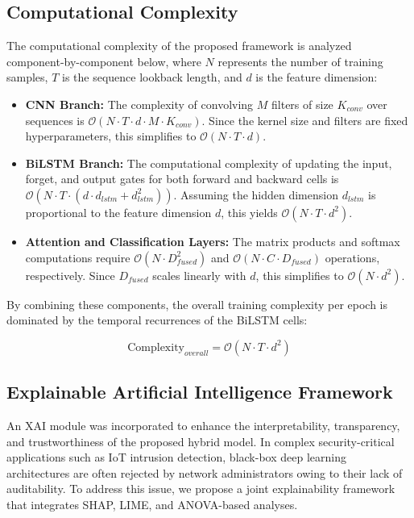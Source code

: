 \documentclass[a4paper,fleqn]{cas-sc}
\begin{document}
\subsection{Computational Complexity}

The computational complexity of the proposed framework is analyzed component-by-component below, where $N$ represents the number of training samples, $T$ is the sequence lookback length, and $d$ is the feature dimension:
\begin{itemize}
    \item \textbf{CNN Branch:} The complexity of convolving $M$ filters of size $K_{conv}$ over sequences is $\mathcal{O}(N \cdot T \cdot d \cdot M \cdot K_{conv})$. Since the kernel size and filters are fixed hyperparameters, this simplifies to $\mathcal{O}(N \cdot T \cdot d)$.
    \item \textbf{BiLSTM Branch:} The computational complexity of updating the input, forget, and output gates for both forward and backward cells is $\mathcal{O}(N \cdot T \cdot (d \cdot d_{lstm} + d_{lstm}^2))$. Assuming the hidden dimension $d_{lstm}$ is proportional to the feature dimension $d$, this yields $\mathcal{O}(N \cdot T \cdot d^2)$.
    \item \textbf{Attention and Classification Layers:} The matrix products and softmax computations require $\mathcal{O}(N \cdot D_{fused}^2)$ and $\mathcal{O}(N \cdot C \cdot D_{fused})$ operations, respectively. Since $D_{fused}$ scales linearly with $d$, this simplifies to $\mathcal{O}(N \cdot d^2)$.
\end{itemize}

By combining these components, the overall training complexity per epoch is dominated by the temporal recurrences of the BiLSTM cells:

\begin{equation}
\text{Complexity}_{overall} = \mathcal{O}(N \cdot T \cdot d^2)
\end{equation}

\subsection{Explainable Artificial Intelligence Framework}

An XAI module was incorporated to enhance the interpretability, transparency, and trustworthiness of the proposed hybrid model. In complex security-critical applications such as IoT intrusion detection, black-box deep learning architectures are often rejected by network administrators owing to their lack of auditability. To address this issue, we propose a joint explainability framework that integrates SHAP, LIME, and ANOVA-based analyses. 
\end{document}
